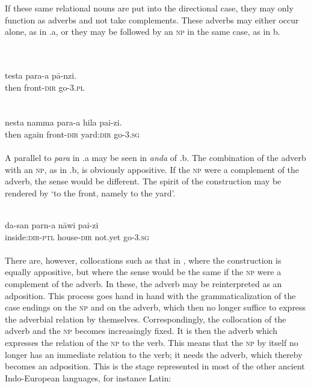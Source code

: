 
\noindent If these same relational nouns are put into the directional case, they may only function as adverbs and not take complements. These adverbs may either occur alone, as in .a, or they may be followed by an \textsc{np} in the same case, as in b.

\ea\label{ex:E69}
\langinfo{\LangHitt}{}{} \\
 \ea {}\\
 \gll  testa  para-a  p\=a-nzi.\\
  then  front-\textsc{dir}  go-3.\textsc{pl}\\
\\
\ex {}\\
\gll  nesta  namma  para-a  hila  pai-zi.\\
  then  again front-\textsc{dir}  yard:\textsc{dir}  go-3.\textsc{sg}\\
\\
\z
\z
\noindent  A parallel to \textit{para} in .a may be seen in \textit{anda} of .b. The combination of the adverb with an \textsc{np}, as in .b, is obviously appositive. If the \textsc{np} were a complement of the adverb, the sense would be different. The spirit of the construction may be rendered by ‘to the front, namely to the yard’.

\ea\label{ex:E70} 
\\
 \gll da-san  parn-a  n\=awi  pai-zi\\
 inside:\textsc{dir}-\textsc{ptl}  house-\textsc{dir}  not.yet  go-3.\textsc{sg}\\
\\
\z
\noindent There are, however, collocations such as that in , where the construction is equally appositive, but where the sense would be the same if the \textsc{np} were a complement of the adverb. In these, the adverb may be reinterpreted as an adposition. This process goes hand in hand with the grammaticalization of the case endings on the \textsc{np} and on the adverb, which then no longer suffice to express the adverbial relation by themselves.\label{page100b} Correspondingly, the collocation of the adverb and the \textsc{np} becomes increasingly fixed. It is then the adverb which expresses the relation of the \textsc{np} to the verb. This means that the \textsc{np} by itself no longer has an immediate relation to the verb; it needs the adverb, which thereby becomes an adposition. This is the stage represented in most of the other ancient Indo-European languages, for instance Latin:

